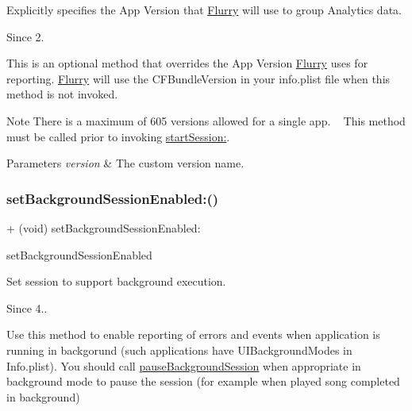Explicitly specifies the App Version that \hyperlink{interfaceFlurry}{Flurry} will use to group Analytics data. 

\begin{DoxySince}{Since}
2.
\end{DoxySince}
This is an optional method that overrides the App Version \hyperlink{interfaceFlurry}{Flurry} uses for reporting. \hyperlink{interfaceFlurry}{Flurry} will use the C\+F\+Bundle\+Version in your info.\+plist file when this method is not invoked.

\begin{DoxyNote}{Note}
There is a maximum of 605 versions allowed for a single app. ~\newline
This method must be called prior to invoking \hyperlink{interfaceFlurry_aeadfa23545c392ffd46db448b6a95809}{start\+Session\+:}.
\end{DoxyNote}

\begin{DoxyParams}{Parameters}
{\em version} & The custom version name. \\
\hline
\end{DoxyParams}
\mbox{\label{interfaceFlurry_a936cba06051ba7a149b988a434d2a05c}} 
\subsubsection{\texorpdfstring{set\+Background\+Session\+Enabled\+:()}{setBackgroundSessionEnabled:()}}
{\footnotesize\ttfamily + (void) set\+Background\+Session\+Enabled\+: \begin{DoxyParamCaption}\item[{(B\+O\+OL)}]{set\+Background\+Session\+Enabled }\end{DoxyParamCaption}}



Set session to support background execution. 

\begin{DoxySince}{Since}
4..
\end{DoxySince}
Use this method to enable reporting of errors and events when application is running in backgorund (such applications have U\+I\+Background\+Modes in Info.\+plist). You should call \hyperlink{interfaceFlurry_a57e18dc7c992272e3dc89e7f3bc853f4}{pause\+Background\+Session} when appropriate in background mode to pause the session (for example when played song completed in background)

